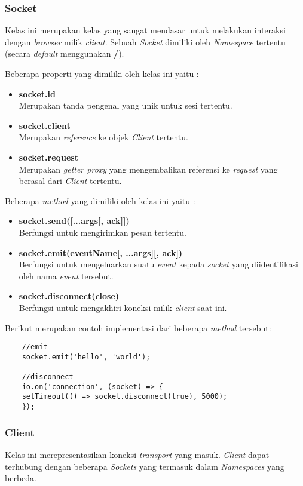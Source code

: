 \subsubsection{Socket}
Kelas ini merupakan kelas yang sangat mendasar untuk melakukan interaksi dengan \textit{browser} milik \textit{client}. Sebuah \textit{Socket} dimiliki oleh \textit{Namespace} tertentu (secara \textit{default} menggunakan \textbf{/}).

Beberapa properti yang dimiliki oleh kelas ini yaitu : 
\begin{itemize}
	\item \textbf{socket.id} \\ Merupakan tanda pengenal yang unik untuk sesi tertentu.
	\item \textbf{socket.client} \\ Merupakan \textit{reference} ke objek \textit{Client} tertentu.
	\item \textbf{socket.request} \\ Merupakan \textit{getter proxy} yang mengembalikan referensi ke \textit{request} yang berasal dari \textit{Client} tertentu.
\end{itemize}

Beberapa \textit{method} yang dimiliki oleh kelas ini yaitu : 
\begin{itemize}
	\item \textbf{socket.send([...args[, ack]])} \\ Berfungsi untuk mengirimkan pesan tertentu.
	\item \textbf{socket.emit(eventName[, ...args][, ack])} \\ Berfungsi untuk mengeluarkan suatu \textit{event} kepada \textit{socket} yang diidentifikasi oleh nama \textit{event} tersebut.
	\item \textbf{socket.disconnect(close)} \\ Berfungsi untuk mengakhiri koneksi milik \textit{client} saat ini.
\end{itemize}

Berikut merupakan contoh implementasi dari beberapa \textit{method} tersebut:

\begin{lstlisting}
	//emit
	socket.emit('hello', 'world');
	
	//disconnect
	io.on('connection', (socket) => {
	setTimeout(() => socket.disconnect(true), 5000);
	});
\end{lstlisting}

\subsubsection{Client}
Kelas ini merepresentasikan koneksi \textit{transport} yang masuk\cite{socketioclient}. \textit{Client} dapat terhubung dengan beberapa \textit{Sockets} yang termasuk dalam \textit{Namespaces} yang berbeda.

